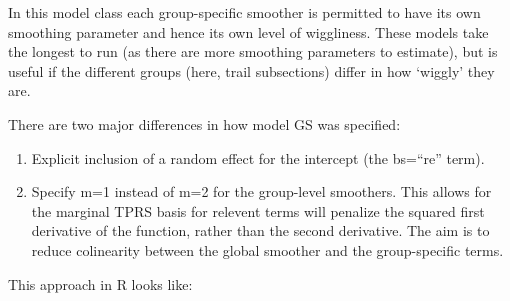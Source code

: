 \documentclass[
]{book}
\begin{document}
In this model class each group-specific smoother is permitted to have its own smoothing parameter and hence its own level of wiggliness. These models take the longest to run (as there are more smoothing parameters to estimate), but is useful if the different groups (here, trail subsections) differ in how `wiggly' they are.

There are two major differences in how model GS was specified:

\begin{enumerate}
\def\labelenumi{\arabic{enumi}.}
\item
  Explicit inclusion of a random effect for the intercept (the bs=``re'' term).
\item
  Specify m=1 instead of m=2 for the group-level smoothers. This allows for the marginal TPRS basis for relevent terms will penalize the squared first derivative of the function, rather than the second derivative. The aim is to reduce colinearity between the global smoother and the group-specific terms.
\end{enumerate}

This approach in R looks like:
\end{document}
